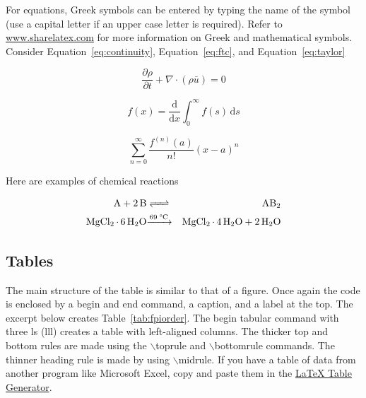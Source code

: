 For equations, Greek symbols can be entered by typing the name of the symbol (use a capital letter if an upper case letter is required). Refer to \href{https://www.sharelatex.com/learn/List_of_Greek_letters_and_math_symbols}{www.sharelatex.com} for more information on Greek and mathematical symbols. Consider Equation~\ref{eq:continuity}, Equation~\ref{eq:ftc}, and Equation~\ref{eq:taylor}

\begin{equation}
\label{eq:continuity}
\frac{\partial \rho}{\partial t} + \nabla \cdot (\rho \bar{u}) = 0
\end{equation}

\begin{equation}
\label{eq:ftc}
f(x) = \frac{\mathrm{d}}{\mathrm{d}x} \int^\infty_0  f(s) \, \mathrm{d}s
\end{equation}

\begin{equation}
\label{eq:taylor}
\sum^\infty_{n=0} \frac{f^{(n)}(a)}{n!} (x-a)^n
\end{equation}

Here are examples of chemical reactions

\begin{eqnarray*}
  \ce{A + 2B &<=>& AB2} \\
  \ce{MgCl_2 {\cdot} 6 H_2O &\xrightarrow{69 \; {\degree C}}& MgCl_2 {\cdot} 4 H_2O + 2H_2O} \\
\end{eqnarray*}

\subsection{Tables}
The main structure of the table is similar to that of a figure. Once again the code is enclosed by a begin and end command, a caption, and a label at the top. The excerpt below creates Table~\ref{tab:fpiorder}. The begin tabular command with three ls (lll) creates a table with left-aligned columns. The thicker top and bottom rules are made using the $\backslash$toprule and $\backslash$bottomrule commands. The thinner heading rule is made by using $\backslash$midrule. If you have a table of data from another program like Microsoft Excel, copy and paste them in the \href{https://www.tablesgenerator.com/}{\LaTeX{} Table Generator}.

